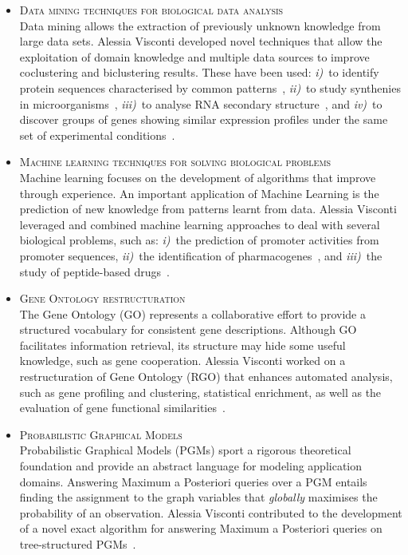 \documentclass[a4paper,10pt]{article}
\newcommand{\smalltitle}[1]{
	\vspace{0.1cm}
	{\noindent 
	\large \textsc{#1}}
	\vspace{0.1cm}
}
\newcommand{\bulletitem}{\item[$\bullet$]}
\begin{document}
\begin{itemize}
\bulletitem \smalltitle{Data mining techniques for biological data analysis}\\
Data mining allows the extraction of previously unknown knowledge from large data sets.
Alessia Visconti developed novel techniques that allow the exploitation of domain knowledge and multiple data sources to improve coclustering and biclustering results.
These have been used: \emph{i)}~to identify protein sequences characterised by common patterns~\cite{Vis08, Cor09a, Cor08b}, \emph{ii)}~to study synthenies in microorganisms~\cite{Bon11}, \emph{iii)}~to analyse RNA secondary structure~\cite{Cor08a}, and \emph{iv)}~to discover groups of genes showing similar expression profiles under the same set of experimental conditions~\cite{Vis13a, Cor09b, Vis11c, Vis12b}.

\bulletitem \smalltitle{Machine learning techniques for solving biological problems}\\
Machine learning focuses on the development of algorithms that improve through experience. An important application of Machine Learning  is the prediction of new knowledge from patterns learnt from data. 
Alessia Visconti leveraged and combined machine learning approaches to deal with several biological problems, such as: \emph{i)}~the prediction of promoter activities from promoter sequences, \emph{ii)}~the identification of pharmacogenes~\cite{Vis12a, Vis12b}, and \emph{iii)}~the study of peptide-based drugs~\cite{Erm14, Vis15a, Erm13a}.

\bulletitem \smalltitle{Gene Ontology restructuration} \\
The Gene Ontology (GO) represents a collaborative effort to provide a structured vocabulary for consistent gene descriptions. Although GO facilitates information retrieval, its structure may hide some useful knowledge, such as gene cooperation.
Alessia Visconti worked on a restructuration of Gene Ontology (RGO) that enhances automated analysis, such as gene profiling and clustering, statistical enrichment, as well as the evaluation of gene functional similarities~\cite{Vis11a, Vis10a, Vis12b}.

\bulletitem \smalltitle{Probabilistic Graphical Models}\\
Probabilistic Graphical Models (PGMs) sport a rigorous theoretical foundation and provide an abstract language for modeling application domains. Answering Maximum a Posteriori queries over a PGM entails finding the assignment to the graph variables that \emph{globally} maximises the probability of an observation. 
Alessia Visconti contributed to the development of a novel exact algorithm for answering Maximum a Posteriori queries on tree-structured PGMs~\cite{Esp13}.

\end{itemize}
\end{document}

